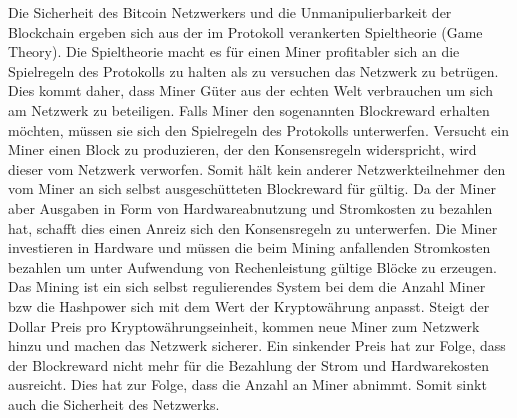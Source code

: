 Die Sicherheit des Bitcoin Netzwerkers und die Unmanipulierbarkeit der Blockchain ergeben sich aus der im Protokoll verankerten Spieltheorie (Game Theory). Die Spieltheorie macht es für einen Miner profitabler sich an die Spielregeln des Protokolls zu halten als zu versuchen das Netzwerk zu betrügen. Dies kommt daher, dass Miner Güter aus der echten Welt verbrauchen um sich am Netzwerk zu beteiligen. Falls Miner den sogenannten Blockreward erhalten möchten, müssen sie sich den Spielregeln des Protokolls unterwerfen. Versucht ein Miner einen Block zu produzieren, der den Konsensregeln widerspricht, wird dieser vom Netzwerk verworfen. Somit hält kein anderer Netzwerkteilnehmer den vom Miner an sich selbst ausgeschütteten Blockreward für gültig. Da der Miner aber Ausgaben in Form von Hardwareabnutzung und Stromkosten zu bezahlen hat, schafft dies einen Anreiz sich den Konsensregeln zu unterwerfen.
Die Miner investieren in Hardware und müssen die beim Mining anfallenden Stromkosten bezahlen um unter Aufwendung von Rechenleistung gültige Blöcke zu erzeugen. 
Das Mining ist ein sich selbst regulierendes System bei dem die Anzahl Miner bzw die Hashpower sich mit dem Wert der Kryptowährung anpasst. Steigt der Dollar Preis pro Kryptowährungseinheit, kommen neue Miner zum Netzwerk hinzu und machen das Netzwerk  sicherer. Ein sinkender Preis hat zur Folge, dass der Blockreward nicht mehr für die Bezahlung der Strom und Hardwarekosten ausreicht. Dies hat zur Folge, dass die Anzahl an Miner abnimmt. Somit sinkt auch die Sicherheit des Netzwerks.

\fi